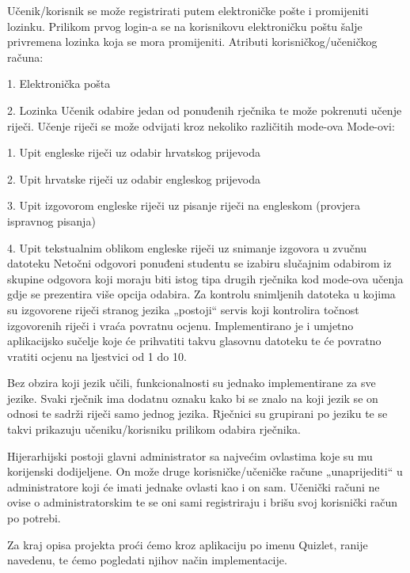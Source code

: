 Učenik/korisnik se može registrirati putem elektroničke pošte i promijeniti lozinku. Prilikom prvog login-a se na korisnikovu elektroničku poštu šalje privremena lozinka koja se mora promijeniti. 
Atributi korisničkog/učeničkog računa: 
\item 1. Elektronička pošta 
\item 2. Lozinka 
Učenik odabire jedan od ponuđenih rječnika te može pokrenuti učenje riječi. 
Učenje riječi se može odvijati kroz nekoliko različitih mode-ova
Mode-ovi:
\item 1.	Upit engleske riječi uz odabir hrvatskog prijevoda 
\item 2.	Upit hrvatske riječi uz odabir engleskog prijevoda
\item 3.	Upit izgovorom engleske riječi uz pisanje riječi na engleskom (provjera ispravnog pisanja)
\item 4.	Upit tekstualnim oblikom engleske riječi uz snimanje izgovora u zvučnu datoteku
Netočni odgovori ponuđeni studentu se izabiru slučajnim odabirom iz skupine odgovora koji moraju biti istog tipa drugih rječnika kod mode-ova učenja gdje se prezentira više opcija odabira. Za kontrolu snimljenih datoteka u kojima su izgovorene riječi stranog jezika „postoji“ servis koji kontrolira točnost izgovorenih riječi i vraća povratnu ocjenu. Implementirano je i umjetno aplikacijsko sučelje koje će prihvatiti takvu glasovnu datoteku te će povratno vratiti ocjenu na ljestvici od 1 do 10. 

Bez obzira koji jezik učili, funkcionalnosti su jednako implementirane za sve jezike. Svaki rječnik ima dodatnu oznaku kako bi se znalo na koji jezik se on odnosi te sadrži riječi samo jednog jezika. Rječnici su grupirani po jeziku te se takvi prikazuju učeniku/korisniku prilikom odabira rječnika. 

Hijerarhijski postoji glavni administrator sa najvećim ovlastima koje su mu korijenski dodijeljene. On može druge korisničke/učeničke račune „unaprijediti“ u administratore koji će imati jednake ovlasti kao i on sam. Učenički računi ne ovise o administratorskim te se oni sami registriraju i brišu svoj korisnički račun po potrebi.

Za kraj opisa projekta proći ćemo kroz aplikaciju po imenu Quizlet, ranije navedenu, te ćemo pogledati njihov način implementacije.

